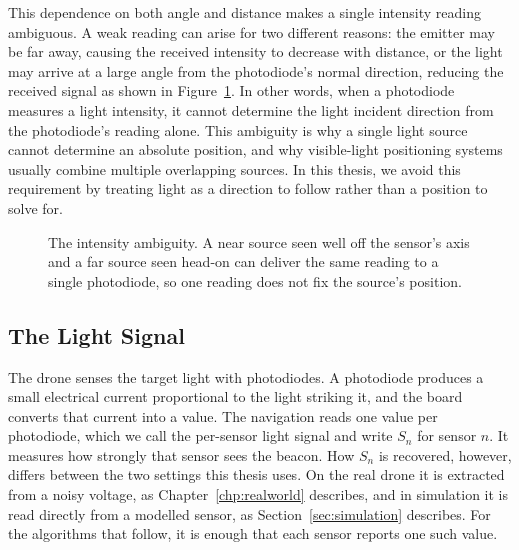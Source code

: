 This dependence on both angle and distance makes a single intensity reading ambiguous. A weak reading can arise for two different reasons: the emitter may be far away, causing the received intensity to decrease with distance, or the light may arrive at a large angle from the photodiode's normal direction, reducing the received signal as shown in Figure~\ref{fig:ambiguity}. In other words, when a photodiode measures a light intensity, it cannot determine the light incident direction from the photodiode's reading alone. This ambiguity is why a single light source cannot determine an absolute position, and why visible-light positioning systems usually combine multiple overlapping sources. In this thesis, we avoid this requirement by treating light as a direction to follow rather than a position to solve for.


\begin{figure}[ht]
    \centering
    \caption{The intensity ambiguity. A near source seen well off the sensor's axis and a far source seen head-on can deliver the same reading to a single photodiode, so one reading does not fix the source's position.}
    \label{fig:ambiguity}
\end{figure}

\subsection{The Light Signal}
\label{sec:lightsignal}

The drone senses the target light with photodiodes. A photodiode produces a small electrical current proportional to the light striking it, and the board converts that current into a value. The navigation reads one value per photodiode, which we call the per-sensor light signal and write $S_n$ for sensor $n$. It measures how strongly that sensor sees the beacon. How $S_n$ is recovered, however, differs between the two settings this thesis uses. On the real drone it is extracted from a noisy voltage, as Chapter~\ref{chp:realworld} describes, and in simulation it is read directly from a modelled sensor, as Section~\ref{sec:simulation} describes. For the algorithms that follow, it is enough that each sensor reports one such value.

